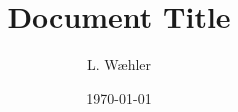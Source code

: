 \documentclass[12pt, letterpaper]{article}
\title{Document Title}
\author{L. Wæhler}
\date{\today}
\begin{document}
\begin{titlepage}
    \maketitle
\end{titlepage}
\end{document}
